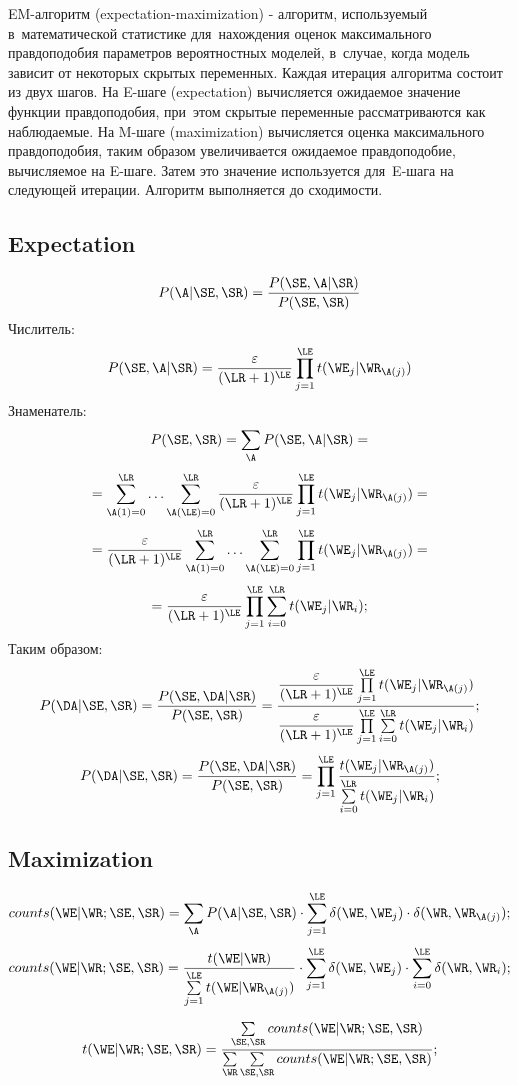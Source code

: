 


EM-алгоритм (expectation-maximization) - алгоритм, используемый в~математической 
статистике для~нахождения оценок максимального правдоподобия параметров вероятностных моделей, 
в~случае, когда модель зависит от некоторых скрытых переменных. 
Каждая итерация алгоритма состоит из двух шагов. 
На E-шаге (expectation) вычисляется ожидаемое значение функции правдоподобия, 
при~этом скрытые переменные рассматриваются как наблюдаемые. 
На M-шаге (maximization) вычисляется оценка максимального правдоподобия, 
таким образом увеличивается ожидаемое правдоподобие, 
вычисляемое на E-шаге. Затем это значение используется для~E-шага 
на следующей итерации. Алгоритм выполняется до сходимости. 

\subsection*{Expectation}

\[
	P(\A | \SE, \SR) = \dfrac{P(\SE, \A| \SR)}
			{P(\SE, \SR)}
\]
Числитель:
\[
	P(\SE, \A| \SR)	= \dfrac{\varepsilon}{(\LR + 1)^{\LE}} \prod\limits_{j = 1}^{\LE} t(\WE_{j} | \WR_{\A(j)}) 
\]
Знаменатель:
\[
	P(\SE, \SR) = \sum\limits_{\A} P(\SE, \A| \SR) = 
\]\[
	= \sum\limits_{\A(1) = 0 }^{\LR} \ldots \sum\limits_{\A(\LE) = 0 }^{\LR}
		\dfrac{\varepsilon}{(\LR + 1)^{\LE}} 
			\prod\limits_{j = 1}^{\LE} t(\WE_{j} | \WR_{\A(j)}) = 
\]\[
	= 	\dfrac{\varepsilon}{(\LR + 1)^{\LE}}
			\sum\limits_{\A(1) = 0 }^{\LR} \ldots \sum\limits_{\A(\LE) = 0 }^{\LR} 
				\prod\limits_{j = 1}^{\LE} t(\WE_{j} | \WR_{\A(j)}) = 
\]\[
	= 	\dfrac{\varepsilon}{(\LR + 1)^{\LE}}
			\prod\limits_{j = 1}^{\LE} 
				\sum\limits_{i = 0 }^{\LR}
					t(\WE_{j} | \WR_{i}); 
\]
Таким образом:
\[
	P(\DA | \SE, \SR) = \dfrac{P(\SE, \DA| \SR)}{P(\SE, \SR)} = 	
		\dfrac
			{
				\dfrac{\varepsilon}{(\LR + 1)^{\LE}} 
					\prod\limits_{j = 1}^{\LE} t(\WE_{j} | \WR_{\A(j)})
			}
			{
				\dfrac{\varepsilon}{(\LR + 1)^{\LE}}
					\prod\limits_{j = 1}^{\LE} 
						\sum\limits_{i = 0 }^{\LR}
							t(\WE_{j} | \WR_{i})
			};
\]\[
	P(\DA | \SE, \SR) = \dfrac{P(\SE, \DA| \SR)}{P(\SE, \SR)} = 	
			\prod\limits_{j = 1}^{\LE} 
				\dfrac{t(\WE_{j} | \WR_{\A(j)})}		
					{\sum\limits_{i = 0 }^{\LR} t(\WE_{j} | \WR_{i})};
\]

\subsection*{Maximization}
\[
	counts(\WE|\WR; \SE, \SR) = \sum\limits_{\A} P(\A | \SE, \SR) 
		\cdot 
			\sum\limits_{j = 1}^{\LE} 
				\delta(\WE, \WE_j) \cdot \delta(\WR, \WR_{\A(j)});
\]\[
	counts(\WE|\WR; \SE, \SR) = 
			\dfrac{t(\WE|\WR)}		
				{\sum\limits_{j = 1 }^{\LE} t(\WE | \WR_{\A(j)})}
			\cdot 
				\sum\limits_{j = 1}^{\LE} 
					\delta(\WE, \WE_j) 
			\cdot 
				\sum\limits_{i = 0}^{\LE} 
					\delta(\WR, \WR_i);
\]

\[
	t(\WE|\WR; \SE, \SR) = \dfrac{\sum\limits_{\SE, \SR} counts(\WE|\WR; \SE, \SR) }
		{\sum\limits_{\WR} \sum\limits_{\SE, \SR} counts(\WE|\WR; \SE, \SR)};
\]

\pagebreak

